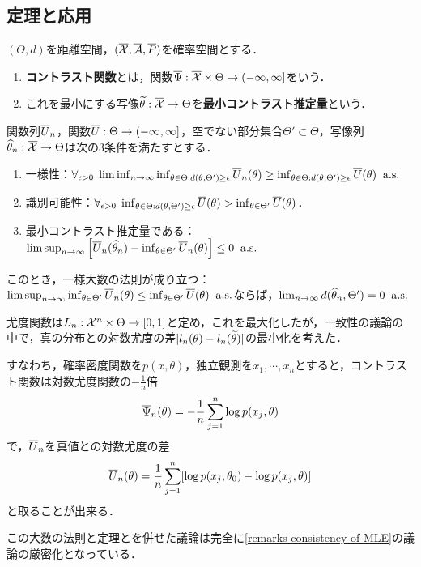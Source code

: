 \documentclass[uplatex,dvipdfmx]{jsreport}
\begin{document}
\subsection{定理と応用}

\begin{definition}
    $(\Theta,d)$を距離空間，$(\overline{\mathcal{X}},\overline{\mathcal{A}},\overline{P})$を確率空間とする．
    \begin{enumerate}
        \item \textbf{コントラスト関数}とは，関数$\overline{\Psi}:\overline{\mathcal{X}}\times\Theta\to(-\infty,\infty]$をいう．
        \item これを最小にする写像$\widetilde{\theta}:\overline{\mathcal{X}}\to\Theta$を\textbf{最小コントラスト推定量}という．
    \end{enumerate}
\end{definition}

\begin{theorem}[最小コントラスト推定量が強一致性を持つための十分条件]
    関数列$\overline{U}_n$，関数$\overline{U}:\Theta\to(-\infty,\infty]$，空でない部分集合$\Theta'\subset\Theta$，写像列$\widehat{\theta}_n:\overline{\mathcal{X}}\to\Theta$は次の3条件を満たすとする．
    \begin{enumerate}[({C}1)]
        \item 一様性：$\forall_{\epsilon>0}\;\liminf_{n\to\infty}\inf_{\theta\in\Theta:d(\theta,\Theta')\ge\epsilon}\overline{U}_n(\theta)\ge\inf_{\theta\in\Theta:d(\theta,\Theta')\ge\epsilon}\overline{U}(\theta)\;\;\mathrm{a.s.}$
        \item 識別可能性：$\forall_{\epsilon>0}\;\inf_{\theta\in\Theta:d(\theta,\Theta')\ge\epsilon}\overline{U}(\theta)>\inf_{\theta\in\Theta'}\overline{U}(\theta)$．
        \item 最小コントラスト推定量である：$\limsup_{n\to\infty}\left[\overline{U}_n(\widehat{\theta}_n)-\inf_{\theta\in\Theta'}\overline{U}_n(\theta)\right]\le0\;\;\mathrm{a.s.}$
    \end{enumerate}
    このとき，一様大数の法則が成り立つ：$\limsup_{n\to\infty}\inf_{\theta\in\Theta'}\overline{U}_n(\theta)\le\inf_{\theta\in\Theta'}\overline{U}(\theta)\;\;\mathrm{a.s.}$ならば，$\lim_{n\to\infty}d(\widehat{\theta}_n,\Theta')=0\;\;\mathrm{a.s.}$
\end{theorem}

\begin{example}[最尤推定]
    尤度関数は$L_n:\mathcal{X}^n\times\Theta\to[0,1]$と定め，これを最大化したが，一致性の議論の中で，真の分布との対数尤度の差$\lvert l_n(\theta)-l_n(\widetilde{\theta})\rvert$の最小化を考えた．

    すなわち，確率密度関数を$p(x,\theta)$，独立観測を$x_1,\cdots,x_n$とすると，コントラスト関数は対数尤度関数の$-\frac{1}{n}$倍
    \[\overline{\Psi}_n(\theta)=-\frac{1}{n}\sum^n_{j=1}\log p(x_j,\theta)\]
    で，$\overline{U}_n$を真値との対数尤度の差
    \[\overline{U}_n(\theta)=\frac{1}{n}\sum^n_{j=1}[\log p(x_j,\theta_0)-\log p(x_j,\theta)]\]
    と取ることが出来る．

    この大数の法則と定理とを併せた議論は完全に\ref{remarks-consistency-of-MLE}の議論の厳密化となっている．
\end{example}
\end{document}
